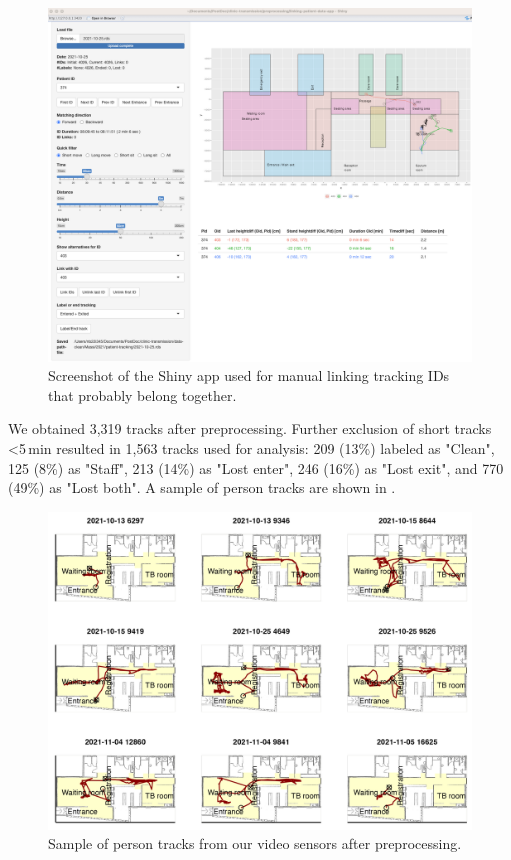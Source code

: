\documentclass[fleqn,11pt]{wlscirep_supp}
\begin{document}
\begin{figure}[!htpb]
    \centering
    \includegraphics[width=\linewidth]{doc/paper/shiny-tool-screenshot.png}
    \caption{Screenshot of the Shiny app used for manual linking tracking IDs that probably belong together.}
    \label{fig:shiny-app}
\end{figure}

We obtained 3,319 tracks after preprocessing. Further exclusion of short tracks <5\,min resulted in 1,563 tracks used for analysis: 209 (13\%) labeled as "Clean", 125 (8\%) as "Staff", 213 (14\%) as "Lost enter", 246 (16\%) as "Lost exit", and 770 (49\%) as "Lost both". A sample of person tracks are shown in .

\begin{figure}[!htpb]
    \centering
    \includegraphics{results/data/example-patient-tracks.png}
    \caption{Sample of person tracks from our video sensors after preprocessing.}
    \label{fig:tracking-examples}
\end{figure}
\end{document}
